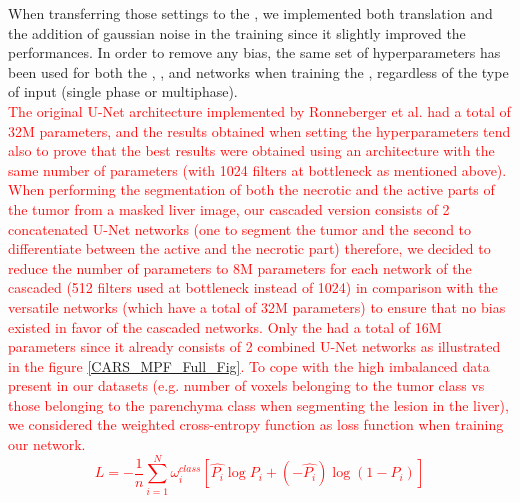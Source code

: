 When transferring those settings to the \textbf{}, 
we implemented both translation and the addition of gaussian
noise in the training since it slightly improved the performances.
In order to remove any bias, the same set of hyperparameters has been
used for both the , ,  and
 networks when training the \textbf{}, regardless of the
type of input (single phase or multiphase). \\
\textcolor{red}{The original U-Net architecture implemented by Ronneberger et al. had a total of 32M parameters, and the results obtained when setting the hyperparameters tend also to prove that the best results were obtained using an architecture with the same number of parameters (with 1024 filters at bottleneck as mentioned above). When performing the segmentation of both the necrotic and the active parts of the tumor from a masked liver image, our cascaded version consists of 2 concatenated U-Net networks (one to segment the tumor and the second to differentiate between the active and the necrotic part) therefore, we decided to reduce the number of parameters to 8M parameters for each network of the cascaded (512 filters used at bottleneck instead of 1024) in comparison with the versatile networks (which have a total of 32M parameters) to ensure that no bias existed in favor of the cascaded networks.
Only the  had a total of 16M parameters since it already consists of 2 combined U-Net networks as illustrated in the figure \ref{CARS_MPF_Full_Fig}.
To cope with the high imbalanced data present in our datasets (e.g. number of voxels belonging to the tumor class vs those belonging to the parenchyma class when segmenting the lesion in the liver), we considered the weighted cross-entropy function as loss function when training our network. 
\begin{equation}
L = -\frac{1}{n} \sum_{i=1}^{N}\omega_i^{class}\left[\hat{P_i} \log P_i + (-\hat{P_i})\log (1 - P_i)\right]
\end{equation}
}




